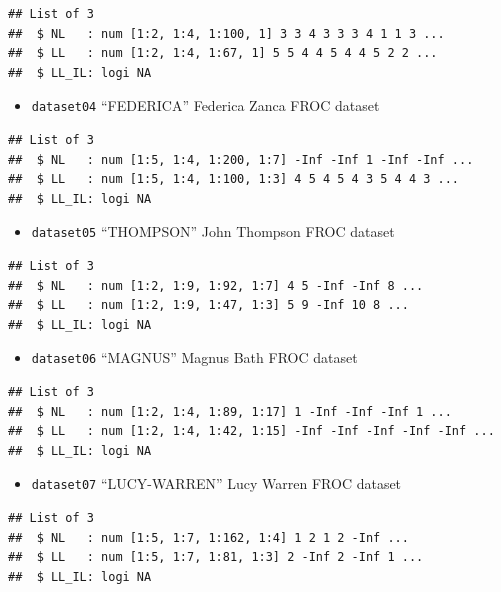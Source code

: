 \documentclass[
]{book}
\providecommand{\tightlist}{%
  \setlength{\itemsep}{0pt}\setlength{\parskip}{0pt}}
\begin{document}
\begin{verbatim}
## List of 3
##  $ NL   : num [1:2, 1:4, 1:100, 1] 3 3 4 3 3 3 4 1 1 3 ...
##  $ LL   : num [1:2, 1:4, 1:67, 1] 5 5 4 4 5 4 4 5 2 2 ...
##  $ LL_IL: logi NA
\end{verbatim}

\begin{itemize}
\tightlist
\item
  \texttt{dataset04} ``FEDERICA'' Federica Zanca FROC dataset \citep{zanca2009evaluation}
\end{itemize}

\begin{verbatim}
## List of 3
##  $ NL   : num [1:5, 1:4, 1:200, 1:7] -Inf -Inf 1 -Inf -Inf ...
##  $ LL   : num [1:5, 1:4, 1:100, 1:3] 4 5 4 5 4 3 5 4 4 3 ...
##  $ LL_IL: logi NA
\end{verbatim}

\begin{itemize}
\tightlist
\item
  \texttt{dataset05} ``THOMPSON'' John Thompson FROC dataset \citep{RN2368}
\end{itemize}

\begin{verbatim}
## List of 3
##  $ NL   : num [1:2, 1:9, 1:92, 1:7] 4 5 -Inf -Inf 8 ...
##  $ LL   : num [1:2, 1:9, 1:47, 1:3] 5 9 -Inf 10 8 ...
##  $ LL_IL: logi NA
\end{verbatim}

\begin{itemize}
\tightlist
\item
  \texttt{dataset06} ``MAGNUS'' Magnus Bath FROC dataset \citep{RN1929}
\end{itemize}

\begin{verbatim}
## List of 3
##  $ NL   : num [1:2, 1:4, 1:89, 1:17] 1 -Inf -Inf -Inf 1 ...
##  $ LL   : num [1:2, 1:4, 1:42, 1:15] -Inf -Inf -Inf -Inf -Inf ...
##  $ LL_IL: logi NA
\end{verbatim}

\begin{itemize}
\tightlist
\item
  \texttt{dataset07} ``LUCY-WARREN'' Lucy Warren FROC dataset \citep{RN2507}
\end{itemize}

\begin{verbatim}
## List of 3
##  $ NL   : num [1:5, 1:7, 1:162, 1:4] 1 2 1 2 -Inf ...
##  $ LL   : num [1:5, 1:7, 1:81, 1:3] 2 -Inf 2 -Inf 1 ...
##  $ LL_IL: logi NA
\end{verbatim}
\end{document}
